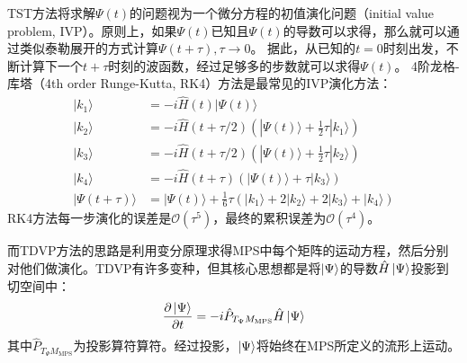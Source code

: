 \documentclass{article}
\begin{document}
TST方法将求解$\Psi(t)$的问题视为一个微分方程的初值演化问题（initial value problem, IVP）。原则上，如果$\Psi(t)$已知且$\Psi(t)$的导数可以求得，那么就可以通过类似泰勒展开的方式计算$\Psi(t+\tau), \tau \xrightarrow{} 0$。 据此，从已知的$t=0$时刻出发，不断计算下一个$t+\tau$时刻的波函数，经过足够多的步数就可以求得$\Psi(t)$。
4阶龙格-库塔（4th order Runge-Kutta, RK4）方法是最常见的IVP演化方法：
\begin{equation}
        \begin{aligned}
        | k_1 \rangle & = -i \hat{H}(t) | \Psi(t) \rangle  \nonumber \\
        | k_2 \rangle & = -i \hat{H}(t + \tau/2) 
            (| \Psi(t) \rangle + \frac{1}{2}
            \tau | k_1 \rangle) \nonumber \\
        | k_3 \rangle & = -i \hat{H}(t + \tau/2) 
            (| \Psi(t) \rangle + \frac{1}{2} 
            \tau | k_2 \rangle) \nonumber \\
        | k_4 \rangle & = -i \hat{H}(t + \tau) 
            (| \Psi(t) \rangle +
            \tau | k_3 \rangle) \nonumber \\
        | \Psi(t+\tau) \rangle & = | \Psi(t) \rangle + \frac{1}{6} \tau(| k_1 \rangle +
        2 | k_2 \rangle + 2| k_3 \rangle + | k_4 \rangle)  \label{eq:RK4}
    \end{aligned}
\end{equation}
RK4方法每一步演化的误差是$\mathcal{O}(\tau^5)$，最终的累积误差为$\mathcal{O}(\tau^4)$。

而TDVP方法的思路是利用变分原理求得MPS中每个矩阵的运动方程，然后分别对他们做演化。TDVP有许多变种，但其核心思想都是将$\ket{\Psi}$的导数$\hat H \ket{\Psi}$投影到切空间中：
\begin{equation}
    \frac{\partial \ket{\Psi}}{\partial t} = -i \hat P_{T_{\Psi}M_{\text{MPS}}} \hat H \ket{\Psi}
\end{equation}
其中$\hat P_{T_{\Psi}M_{\text{MPS}}}$为投影算符算符。经过投影，$\ket{\Psi}$将始终在MPS所定义的流形上运动。
\end{document}
